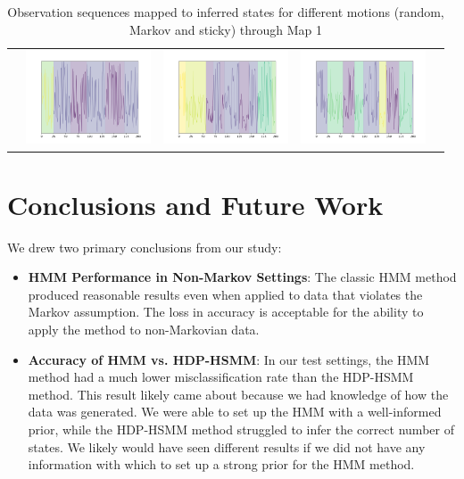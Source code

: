 \documentclass{article}
\begin{document}
\newcommand{\addrandomseqa}{\includegraphics[width=10em]{images/hdphsmm/random-m1-seq.png}}
\newcommand{\addmarkovseqa}{\includegraphics[width=10em]{images/hdphsmm/markov-m1-seq.png}}
\newcommand{\addcorrseqa}{\includegraphics[width=10em]{images/hdphsmm/corr-m1-seq.png}}
\begin{table}[H]
\sffamily
\centering
\begin{tabular}{l*4{C}@{}}
& \addrandomseqa & \addmarkovseqa & \addcorrseqa \\
\end{tabular}
\caption{Observation sequences mapped to inferred states for different motions (random, Markov and sticky) through Map 1}
\label{table:stateinfer}
\end{table}

\section{Conclusions and Future Work}

We drew two primary conclusions from our study:

\begin{itemize}
	\item \textbf{HMM Performance in Non-Markov Settings}: The classic HMM method produced reasonable results even when applied to data that violates the Markov assumption. The loss in accuracy is acceptable for the ability to apply the method to non-Markovian data.
	\item \textbf{Accuracy of HMM vs. HDP-HSMM}: In our test settings, the HMM method had a much lower misclassification rate than the HDP-HSMM method. This result likely came about because we had knowledge of how the data was generated. We were able to set up the HMM with a well-informed prior, while the HDP-HSMM method struggled to infer the correct number of states. We likely would have seen different results if we did not have any information with which to set up a strong prior for the HMM method.
\end{itemize}
\end{document}
